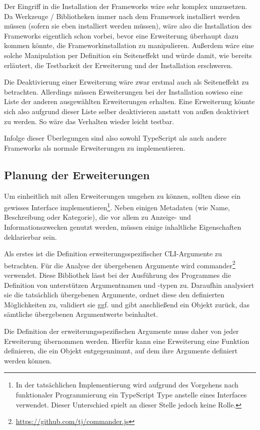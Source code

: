 Der Eingriff in die Installation der Frameworks wäre sehr komplex umzusetzen. Da Werkzeuge / Bibliotheken immer nach dem Framework installiert werden müssen (sofern sie eben installiert werden müssen), wäre also die Installation des Frameworks eigentlich schon vorbei, bevor eine Erweiterung überhaupt dazu kommen könnte, die Frameworkinstallation zu manipulieren. Außerdem wäre eine solche Manipulation per Definition ein Seiteneffekt und würde damit, wie bereits erläutert, die Testbarkeit der Erweiterung und der Installation erschweren.

Die Deaktivierung einer Erweiterung wäre zwar erstmal auch als Seiteneffekt zu betrachten. Allerdings müssen Erweiterungen bei der Installation sowieso eine Liste der anderen ausgewählten Erweiterungen erhalten. Eine Erweiterung könnte sich also aufgrund dieser Liste selber deaktivieren anstatt von außen deaktiviert zu werden. So wäre das Verhalten wieder leicht testbar.

Infolge dieser Überlegungen sind also sowohl TypeScript als auch andere Frameworks als normale Erweiterungen zu implementieren.

\subsection{Planung der Erweiterungen}
Um einheitlich mit allen Erweiterungen umgehen zu können, sollten diese ein gewisses Interface implementieren\footnote{In der tatsächlichen Implementierung wird aufgrund des Vorgehens nach funktionaler Programmierung ein TypeScript Type anstelle eines Interfaces verwendet. Dieser Unterschied spielt an dieser Stelle jedoch keine Rolle.}. Neben einigen Metadaten (wie Name, Beschreibung oder Kategorie), die vor allem zu Anzeige- und Informationszwecken genutzt werden, müssen einige inhaltliche Eigenschaften deklarierbar sein.

Als erstes ist die Definition erweiterungsspezifischer \gls{CLI}-Argumente zu betrachten. Für die Analyse der übergebenen Argumente wird commander\footnote{\url{https://github.com/tj/commander.js}} verwendet. Diese Bibliothek lässt bei der Ausführung des Programmes die Definition von unterstützen Argumentnamen und -typen zu. Daraufhin analysiert sie die tatsächlich übergebenen Argumente, ordnet diese den definierten Möglichkeiten zu, validiert sie ggf. und gibt anschließend ein Objekt zurück, das sämtliche übergebenen Argumentwerte beinhaltet.

Die Definition der erweiterungsspezifischen Argumente muss daher von jeder Erweiterung übernommen werden. Hierfür kann eine Erweiterung eine Funktion definieren, die ein Objekt entgegennimmt, auf dem ihre Argumente definiert werden können.

